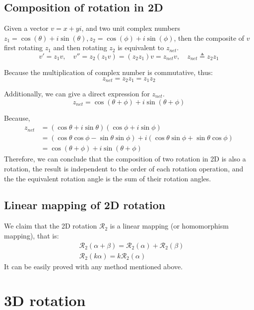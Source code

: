 \documentclass[runningheads,a4paper,english]{llncs}[2022/01/12]
\newcommand{\sR}{\mathscr{R}}
\begin{document}
\subsection{Composition of rotation in 2D}
Given a vector $v=x+yi$, and two unit complex numbers $z_1=\cos(\theta)+i\sin(\theta), z_2=\cos(\phi)+i\sin(\phi)$,
then the composite of $v$ first rotating $z_1$ and then rotating $z_2$ is equivalent to $z_{net}$.
\begin{equation}
  v'=z_1v,\quad v''=z_2(z_1v)=(z_2z_1)v=z_{net}v,\quad z_{net}\triangleq z_2z_1
\end{equation}

Because the multiplication of complex number is commutative, thus:
\begin{equation}
  z_{net}= z_2z_1 = z_1z_2
\end{equation}

Additionally, we can give a direct expression for $z_{net}$.
\begin{equation}
  z_{net}= \cos(\theta+\phi)+i\sin(\theta+\phi)
\end{equation}

Because,
\begin{equation}
  \begin{aligned}
    z_{net}
    &= (\cos\theta+i\sin\theta)(\cos\phi+i\sin\phi)\\
    &= (\cos\theta\cos\phi-\sin\theta\sin\phi)+i(\cos\theta\sin\phi+\sin\theta\cos\phi)\\
    &= \cos(\theta+\phi) + i\sin(\theta+\phi)
  \end{aligned}
\end{equation}
Therefore, we can conclude that the composition of two rotation in 2D is also a rotation, the result is independent to the order of each rotation operation, and the the equivalent rotation angle is the sum of their rotation angles.

\subsection{Linear mapping of 2D rotation}
We claim that the 2D rotation $\sR_2$ is a linear mapping (or homomorphism mapping), that is:
\begin{align}
  &\sR_2(\alpha+\beta)=\sR_2(\alpha)+\sR_2(\beta)\\
  &\sR_2(k\alpha)=k\sR_2(\alpha)
\end{align}
It can be easily proved with any method mentioned above.


\section{3D rotation}
\end{document}
